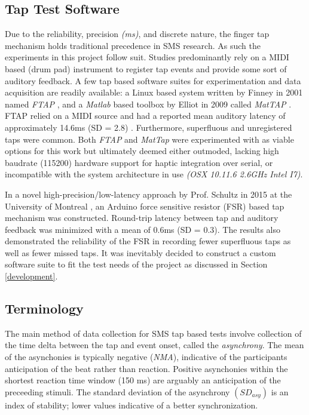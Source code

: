 \subsection{Tap Test Software} \label{ttsw}
Due to the reliability, precision \textit{(ms)}, and discrete nature, the finger tap mechanism holds traditional precedence in SMS research. As such the experiments in this project follow suit. Studies predominantly rely on a MIDI based (drum pad) instrument to register tap events and provide some sort of auditory feedback. A few tap based software suites for experimentation and data acquisition are readily available: a Linux based system written by Finney in 2001 named \textit{FTAP} \cite{finney2001ftap}, and a \textit{Matlab} based toolbox by Elliot in 2009 called \textit{MatTAP} \cite{elliott2009mattap}. FTAP relied on a MIDI source and had a reported mean auditory latency of approximately 14.6ms (SD = 2.8) \cite{schultz2016tap}. Furthermore, superfluous and unregistered taps were common.
Both \textit{FTAP} and \textit{MatTap} were experimented with as viable options for this work but ultimately deemed either outmoded, lacking high baudrate (115200) hardware support for haptic integration over serial, or incompatible with the system architecture in use \textit{(OSX 10.11.6 2.6GHz Intel I7)}.

In a novel high-precision/low-latency approach by Prof. Schultz in 2015 at the University of Montreal \cite{schultz2016tap}, an Arduino force sensitive resistor (FSR) based tap mechanism was constructed. Round-trip latency between tap and auditory feedback was minimized with a mean of 0.6ms (SD = 0.3). The results also demonstrated the reliability of the FSR in recording fewer superfluous taps as well as fewer missed taps.
It was inevitably decided to construct a custom software suite to fit the test needs of the project as discussed in Section \ref{development}.

\subsection{Terminology} \label{SMSTerms}
The main method of data collection for SMS tap based tests involve collection of the time delta between the tap and event onset, called the \textit{asynchrony}. The mean of the asynchonies is typically negative (\textit{NMA}), indicative of the participants anticipation of the beat rather than reaction. Positive asynchonies within the shortest reaction time window (150 ms) are arguably an anticipation of the preceeding stimuli. The standard deviation of the asynchrony $(SD_{asy})$ is an index of stability; lower values indicative of a better synchronization.  \cite{repp2013sensorimotor}

